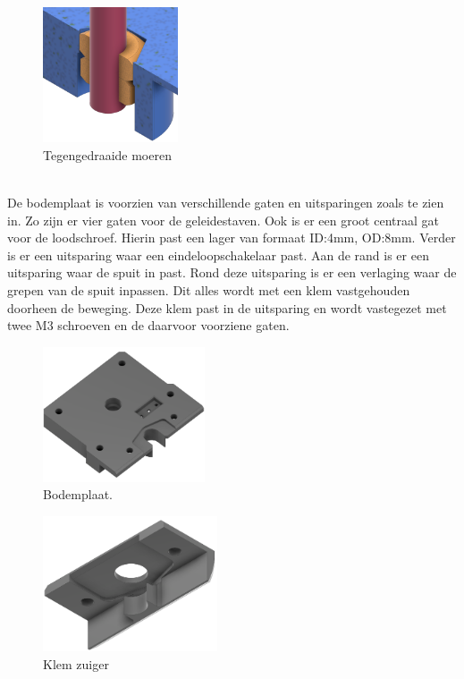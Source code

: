 \begin{minipage}[t]{0.49\textwidth}
    \begin{figure}[H]
        \centering
        \includegraphics[height=4cm]{figures/InterlockingScrews.png}
        \caption{Tegengedraaide moeren}\label{fig:counterrotated}
    \end{figure}
\end{minipage}\\[12pt]
De bodemplaat is voorzien van verschillende gaten en uitsparingen zoals te zien in. Zo zijn er vier gaten voor de geleidestaven. Ook is er een groot centraal gat voor de loodschroef. Hierin past een lager van formaat ID:4mm, OD:8mm. Verder is er een uitsparing waar een eindeloopschakelaar past. Aan de rand is er een uitsparing waar de spuit in past. Rond deze uitsparing is er een verlaging waar de grepen van de spuit inpassen. Dit alles wordt met een klem vastgehouden doorheen de beweging. Deze klem past in de uitsparing en wordt vastegezet met twee M3 schroeven en de daarvoor voorziene gaten.
\\[12pt]\begin{minipage}[t]{0.49\textwidth}
    \vspace{0pt}
    \begin{figure}[H]
        \centering
        \includegraphics[height=4cm]{figures/Foundation_1_w.png}
        \caption{Bodemplaat.}\label{fig:bodemplaat}
    \end{figure}
\end{minipage}
\begin{minipage}[t]{0.49\textwidth}
    \vspace{0pt}
    \begin{figure}[H]
        \centering
        \includegraphics[height=4cm]{figures/Foundation_clamp_w.png}
        \caption{Klem zuiger}\label{fig:clamp}
    \end{figure}
\end{minipage}\\

